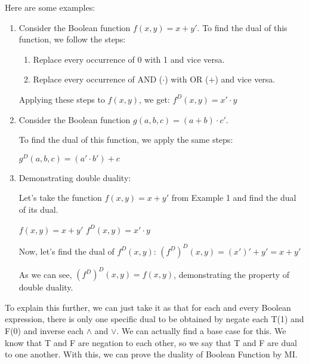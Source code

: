     \begin{example}
        Here are some examples:
        \begin{enumerate}
            \item Consider the Boolean function $f(x, y) = x + y'$.
            To find the dual of this function, we follow the steps:
            \begin{enumerate}
                \item Replace every occurrence of 0 with 1 and vice versa.
                \item Replace every occurrence of AND ($\cdot$) with OR ($+$) and vice versa.
            \end{enumerate}
            
            Applying these steps to $f(x, y)$, we get:
            $f^D(x, y) = x' \cdot y$
            
            \item Consider the Boolean function $g(a, b, c) = (a + b) \cdot c'$.
            
            To find the dual of this function, we apply the same steps:
            
            $g^D(a, b, c) = (a' \cdot b') + c$
            
            \item Demonstrating double duality:
            
            Let's take the function $f(x, y) = x + y'$ from Example 1 and find the dual of its dual.
            
            $f(x, y) = x + y'$
            $f^D(x, y) = x' \cdot y$
            
            Now, let's find the dual of $f^D(x, y)$:
            $(f^D)^D(x, y) = (x')' + y' = x + y'$
            
            As we can see, $(f^D)^D(x, y) = f(x, y)$, demonstrating the property of double duality.
        \end{enumerate}
    \end{example}
    
    To explain this further, we can just take it as that for each and every Boolean expression, there is only one specific dual to be obtained by negate each T(1) and F(0)
    and inverse each $\land$ and $\lor$. We can actually find a base case for this. We know that T and F are negation to each other, so we say that T and F are dual
    to one another. With this, we can prove the duality of Boolean Function by MI.

